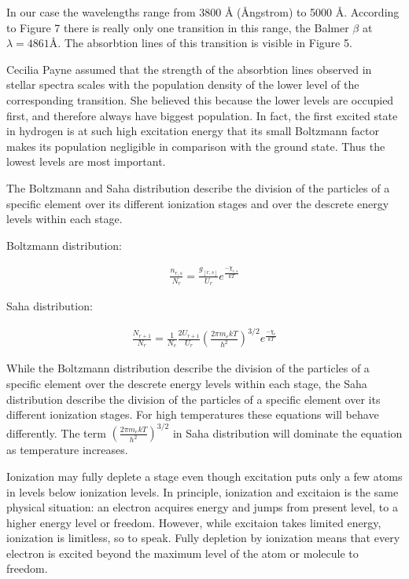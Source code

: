 \documentclass[norsk,a4paper,12pt]{article}
\begin{document}
In our case the wavelengths range from 3800 Å (Ångstrom) to 5000 Å. According to Figure 7 there is really only one 
transition in this range, the Balmer $\beta$ at $\lambda = 4861 Å$. The absorbtion lines of this transition is visible
in Figure 5.

Cecilia Payne assumed that the strength of the absorbtion lines observed in stellar spectra scales with the population 
density of the lower level of the corresponding transition. She believed this because the lower levels are occupied 
first, and therefore always have biggest population. In fact, the first excited state in hydrogen is at such high
excitation energy that its small Boltzmann factor makes its population negligible in comparison with the ground state.
Thus the lowest levels are most important.

The Boltzmann and Saha distribution describe the division of the particles of a specific element over its different 
ionization stages and over the descrete energy levels within each stage.

Boltzmann distribution:

\begin{align*}
\frac{n_{r,s}}{N_r} = \frac{g_[r,s]}{U_r}e^{\frac{-\chi_{r,s}}{kT}}
\end{align*} 

Saha distribution:

\begin{align*}
\frac{N_{r+1}}{N_r} = \frac{1}{N_e} \frac{2U_{r+1}}{U_r} (\frac{2\pi m_ekT}{h^2})^{3/2} e^{\frac{-\chi_{r}}{kT}}
\end{align*} 

While the Boltzmann distribution describe the division of the particles of a specific element over the descrete energy 
levels within each stage, the Saha distribution describe the division of the particles of a specific element over its different 
ionization stages. For high temperatures these equations will behave differently. 
The term $(\frac{2\pi m_ekT}{h^2})^{3/2} $ in Saha distribution will dominate the equation as temperature increases.

Ionization may fully deplete a stage even though excitation puts only a few atoms in levels below ionization levels.
In principle, ionization and excitaion is the same physical situation: an electron acquires energy and jumps 
from present level, to a higher energy level or freedom. However, while excitaion takes limited energy, ionization is 
limitless, so to speak. Fully depletion by ionization means that every electron is excited beyond the maximum level 
of the atom or molecule to freedom. 
\end{document}
